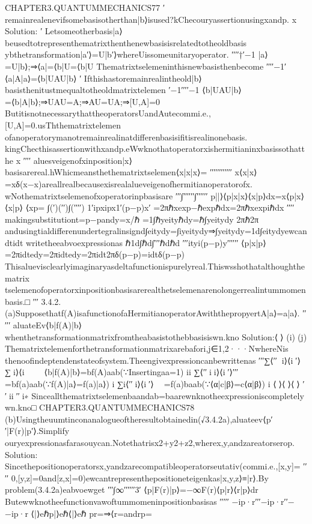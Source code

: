 {{CHAPTER3.QUANTUMMECHANICS77
′
remainrealenevifsomebasisotherthan{|b⟩}isused?kChecouryassertionusingxandp.
x
Solution:
′
Letsomeotherbasis|a⟩beusedtotrepresenthematrixthenthenewbasisisrelatedtotheoldbasis
ybthetransformation|a′⟩=U|b′⟩whereUissomeunitaryoperator.
′′′′†′−1
|a⟩=U|b⟩;⇒⟨a|=⟨b|U=⟨b|U
Thematrixtselemeninthisnewbasisthenbecome
′′′′−1′
⟨a|A|a⟩=⟨b|UAU|b⟩
′
Ifthishastoremainrealintheold|b⟩basisthenitustmequaltotheoldmatrixtelemen
′−1′′′′−1
⟨b|UAU|b⟩=⟨b|A|b⟩;⇒UAU=A;⇒AU=UA;⇒[U,A]=0
ButitisnotnecessarythattheoperatorsUandAutecommi.e.,[U,A]=0.usThthematrixtelemen
ofanoperatorymanotremainrealinatdifferenbasisifitisrealinonebasis.
kingChecthisassertionwithxandp.eWwknothatoperatorxishermitianinxbasissothatthe
x
′′′′
aluesveigenofxinposition|x⟩basisarereal.hWhicmeansthethematrixtselemen⟨x|x|x⟩=
′′′′′′′′′′′′
x⟨x|x⟩=xδ(x−x)areallrealbecausexisrealalueveigenofhermitianoperatorofx.
wNothematrixtselemenofxoperatorinpbasisare
′′′∫′′′′′′∫′′′′′′
p||⟩⟨p|x|x⟩⟨x|p⟩dx=x⟨p|x⟩⟨x|p⟩
⟨xp=
∫(′)(′′)∫(′′′′)
1′ipxipx1′(p−p)x′
=2πℏxexp−ℏexpℏdx=2πℏxexpiℏdx
′′′′
makingsubstitutiont=p−pandy=x/ℏ
=1∫ℏyeityℏdy=ℏ∫yeitydy
2πℏ2π
andusingtialdifferenundertegralinsignd∫eitydy=∫iyeitydy⇒∫yeitydy=1d∫eitydyewcan
dtidt
writetheeabvoexpressionas
ℏ1d∫ℏd∫′′′ℏdℏd
′′′ityi(p−p)y′′′′′′
⟨p|x|p⟩=2πidtedy=2πidtedy=2πidt2πδ(p−p)=idtδ(p−p)
Thisaluevisclearlyimaginaryasdeltafunctionispurelyreal.Thiswsshothatalthoughthematrix
tselemenofoperatorxinpositionbasisarerealthetselemenarenolongerrealintummomenbasis.□
′′′
3.4.2.(a)Supposethatf(A)isafunctionofaHermitianoperatorAwiththepropyertA|a⟩=a|a⟩.
′′′′′
aluateEv⟨b|f(A)|b⟩whenthetransformationmatrixfromtheabasistothebbasisiswn.kno
Solution:⟨⟩
(i)(j)
Thematrixtelemenforthetransformationmatrixarebafori,j∈{1,2···N}whereNis
thenoofindeptendenstateofsystem.Theengivexpressioncanbewrittenas
′′′∑⟨′′i⟩⟨i′⟩∑i⟩⟨i

⟨b|f(A)|b⟩=bf(A)aab(∵Insertingaa=1)
ii
∑⟨′′ii⟩⟨i′⟩′′′

=bf(a)aab(∵f(A)|a⟩=f(a)|a⟩)
i
∑i⟨′′i⟩⟨i′⟩

=f(a)baab(∵⟨α|c|β⟩=c⟨α|β⟩)
i
⟨⟩⟨⟩⟨⟩
′′ii′′i∗
Sinceallthematrixtselemenbaandab=baarewnknotheexpressioniscompletely
wn.kno□
CHAPTER3.QUANTUMMECHANICS78
(b)Usingtheuumtinconanalogueoftheresultobtainedin(√3.4.2a),aluateev⟨p′′|F(r)|p′⟩.Simplify
ouryexpressionasfarasouycan.Notethatrisx2+y2+z2,wherex,y,andzareatorserop.
Solution:
Sincethepositionoperatorsx,yandzarecompatibleoperatorseutativ(commi.e.,[x,y]=
′′′′
0,[y,z]=0and[z,x]=0)ewcantrepresenthepositioneteigenkas|x,y,z⟩≡|r⟩.By
problem(3.4.2a)eabvoewget
′′′∫∞′′′′′′3′
⟨p|F(r)|p⟩=−∞F(r)⟨p|r⟩⟨r|p⟩dr
Butewwknotheefunctionvawoftummomeninpositionbasisas
′′′′′
−ip·r′′′−ip·r′′−−ip·r
⟨|⟩eℏp|⟩eℏ⟨|⟩eℏ
pr=⇒⟨r=andrp=
}}
